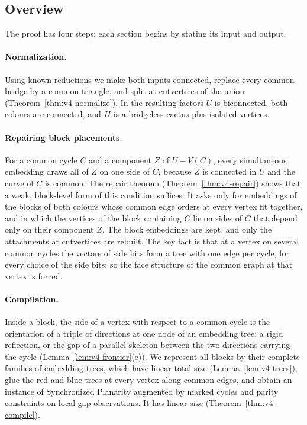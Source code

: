 \subsection{Overview}\label{sec:intro-overview}
The proof has four steps; each section begins by stating its input and
output.

\paragraph{Normalization.}
Using known reductions we make both inputs connected, replace every common
bridge by a common triangle, and split at cutvertices of the union
(Theorem~\ref{thm:v4-normalize}). In the resulting factors $U$ is
biconnected, both colours are connected, and $H$ is a bridgeless cactus plus
isolated vertices.

\paragraph{Repairing block placements.}
For a common cycle $C$ and a component $Z$ of $U-V(C)$, every simultaneous
embedding draws all of $Z$ on one side of $C$, because $Z$ is connected in
$U$ and the curve of $C$ is common. The repair theorem
(Theorem~\ref{thm:v4-repair}) shows that a weak, block-level form of this
condition suffices. It asks only for embeddings of the blocks of both
colours whose common edge orders at every vertex fit together, and in which
the vertices of the block containing $C$ lie on sides of $C$ that depend
only on their component $Z$. The block embeddings are kept, and only the
attachments at cutvertices are rebuilt. The key fact is that at a vertex on
several common cycles the vectors of side bits form a tree with one edge per
cycle, for every choice of the side bits; so the face structure of the
common graph at that vertex is forced.

\paragraph{Compilation.}
Inside a block, the side of a vertex with respect to a common cycle is the
orientation of a triple of directions at one node of an embedding tree: a
rigid reflection, or the gap of a parallel skeleton between the two
directions carrying the cycle (Lemma~\ref{lem:v4-frontier}(c)). We represent all
blocks by their complete families of embedding trees, which have linear
total size (Lemma~\ref{lem:v4-trees}), glue the red and blue trees at every
vertex along common edges, and obtain an instance of Synchronized Planarity
augmented by marked cycles and parity constraints on local gap observations.
It has linear size (Theorem~\ref{thm:v4-compile}).

